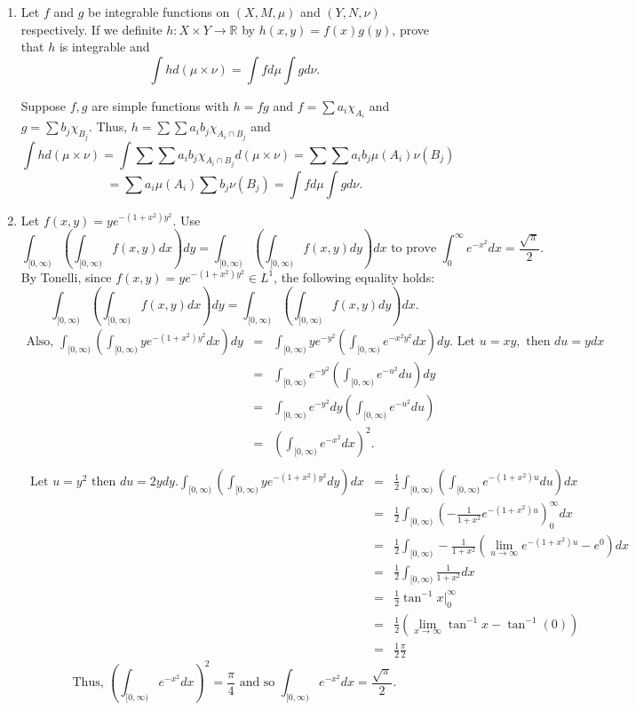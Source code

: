 \begin{enumerate}
\item Let $f$ and $g$ be integrable functions on $(X,M,\mu)$ and $(Y,N,\nu)$ respectively. If we definite $h: X \times Y \to \mathbb{R}$ by $h(x,y) =f(x)g(y)$, prove that $h$ is integrable and \[\int h d(\mu \times \nu) = \int f d \mu \int g d\nu.\]
\begin{pf}
Suppose $f,g$ are simple functions with $h=fg$ and $f = \sum a_i \chi_{A_i}$ and $g = \sum b_j \chi_{B_j}$. Thus, $h=\sum \sum a_i b_j \chi_{A_i \cap B_j }$ and 
\[
\int h d(\mu \times \nu) = \int  \sum \sum a_i b_j \chi_{A_i \cap B_j } d(\mu \times \nu)=\sum \sum a_i b_j \mu (A_i)\nu(B_j)
\]
\[
=\sum  a_i\mu (A_i) \sum b_j \nu(B_j) = \int f d\mu \int g d \nu.
\]\end{pf}
\item Let $f(x,y)=ye^{-(1+x^2)y^2}$. Use \[
\int_{[0, \infty)}\left( \int_{[0, \infty)}f(x,y)dx\right)dy =\int_{[0, \infty)}\left( \int_{[0, \infty)}f(x,y)dy\right)dx \text{ to prove } \int_0^\infty e^{-x^2}dx=\frac{\sqrt{\pi}}{2}.
\]
By Tonelli, since $f(x,y)=ye^{-(1+x^2)y^2} \in L^1$, the following equality holds: \[\int_{[0, \infty)}\left( \int_{[0, \infty)}f(x,y)dx\right)dy =\int_{[0, \infty)}\left( \int_{[0, \infty)}f(x,y)dy\right)dx.\]
\begin{eqnarray*}
	\text{Also, } \int_{[0, \infty)}\left( \int_{[0, \infty)}ye^{-(1+x^2)y^2}dx\right)dy & = & \int_{[0, \infty)}ye^{-y^2}\left( \int_{[0, \infty)}e^{-x^2y^2}dx\right)dy. \text{ Let } u = xy, \text{ then } du = ydx \\
	& = & \int_{[0, \infty)}e^{-y^2}\left( \int_{[0, \infty)}e^{-u^2}du\right)dy\\
	& = & \int_{[0, \infty)}e^{-y^2}dy\left( \int_{[0, \infty)}e^{-u^2}du\right)\\
	& = & \left( \int_{[0, \infty)}e^{-x^2}dx\right)^2.\\
\end{eqnarray*}
\begin{eqnarray*}
	\text{ Let } u = y^2 \text{ then } du = 2ydy. 	\int_{[0, \infty)}\left( \int_{[0, \infty)}ye^{-(1+x^2)y^2}dy\right)dx & = & \frac{1}{2} \int_{[0, \infty)}\left( \int_{[0, \infty)}e^{-(1+x^2)u}du\right)dx\\
	& = & \frac{1}{2}\int_{[0, \infty)}\left( -\frac{1}{1+x^2}e^{-(1+x^2)u}\right)_{0}^\infty dx\\
	 &=&  \frac{1}{2}\int_{[0, \infty)} -\frac{1}{1+x^2}\left(\lim_{u \rightarrow \infty}e^{-(1+x^2)u}-e^{0} \right)dx   \\
	& = & \frac{1}{2}\int_{[0, \infty)} \frac{1}{1+x^2}dx\\
	& = & \frac{1}{2}\tan^{-1}x |_0^\infty\\
	&  = & \frac{1}{2}\left(\lim_{x \rightarrow \infty}\tan^{-1}x - \tan^{-1}(0)\right)\\
	& = & \frac{1}{2}\frac{\pi}{2}
\end{eqnarray*}
\[
\text{Thus, } \left( \int_{[0, \infty)}e^{-x^2}dx\right)^2= \frac{\pi}{4} \text{ and so } \int_{[0, \infty)}e^{-x^2}dx= \frac{\sqrt{\pi}}{2}.
\]
\end{enumerate}